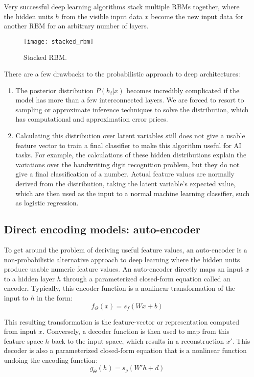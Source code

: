 Very successful deep learning algorithms stack multiple RBMs together, where the hidden units \(h\) from the visible input data \(x\) become the new input data for another RBM for an arbitrary number of layers. 

\begin{figure}[h!]
  \centering
    \texttt{[image: stacked\_rbm]}
\caption{Stacked RBM.}
\end{figure}



There are a few drawbacks to the probabilistic approach to deep architectures:
\begin{enumerate}
\item The posterior distribution \(P(h_i | x)\) becomes incredibly complicated if the model has more than a few interconnected layers. We are forced to resort to sampling or approximate inference techniques to solve the distribution, which has computational and approximation error prices.
\item Calculating this distribution over latent variables still does not give a usable feature vector to train a final classifier to make this algorithm useful for AI tasks. For example, the calculations of these hidden distributions explain the variations over the handwriting digit recognition problem, but they do not give a final classification of a number. Actual feature values are normally derived from the distribution, taking the latent variable's expected value, which are then used as the input to a normal machine learning classifier, such as logistic regression.
\end{enumerate}

\subsection{Direct encoding models: auto-encoder}
To get around the problem of deriving useful feature values, an auto-encoder is a non-probabilistic alternative approach to deep learning where the hidden units produce usable numeric feature values. An auto-encoder directly maps an input \(x\) to a hidden layer \(h\) through a parameterized closed-form equation called an encoder. Typically, this encoder function is a nonlinear transformation of the input to \(h\) in the form:
\[f_\Theta (x) = s_f (Wx + b)\]

This resulting transformation is the feature-vector or representation computed from input \(x\).
Conversely, a decoder function is then used to map from this feature space \(h\) back to the input space, which results in a reconstruction \(x'\). This decoder is also a parameterized closed-form equation that is a nonlinear function undoing the encoding function:
\[g_\Theta (h) = s_g (W' h + d)\]

